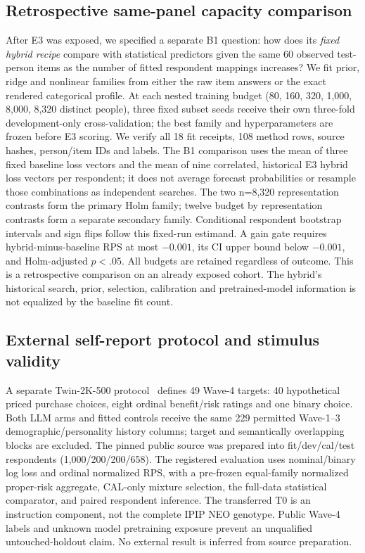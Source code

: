 \documentclass[10pt,twocolumn]{article}
\begin{document}
\subsection{Retrospective same-panel capacity comparison}
After E3 was exposed, we specified a separate B1 question: how does its
\emph{fixed hybrid recipe} compare with statistical predictors given the same
60 observed test-person items as the number of fitted respondent mappings
increases? We fit prior, ridge and nonlinear families from either the raw
item answers or the exact rendered categorical profile. At each nested
training budget (80, 160, 320, 1,000, 8,000, 8,320 distinct people), three
fixed subset seeds receive their own three-fold development-only
cross-validation; the best family and hyperparameters are frozen before E3
scoring. We verify all 18 fit receipts, 108 method rows, source hashes,
person/item IDs and labels. The B1 comparison uses the mean of three fixed
baseline loss vectors and the mean of nine correlated, historical E3 hybrid
loss vectors per respondent; it does not average forecast probabilities or
resample those combinations as independent searches. The two n=8,320
representation contrasts form the primary Holm family; twelve budget by
representation contrasts form a separate secondary family. Conditional
respondent bootstrap intervals and sign flips follow this fixed-run estimand.
A gain gate requires hybrid-minus-baseline RPS at most $-0.001$, its CI upper
bound below $-0.001$, and Holm-adjusted $p<.05$. All budgets are retained
regardless of outcome. This is a retrospective comparison on an already
exposed cohort. The hybrid's historical search, prior, selection, calibration
and pretrained-model information is not equalized by the baseline fit count.

\subsection{External self-report protocol and stimulus validity}
A separate Twin-2K-500 protocol~\cite{toubia2025twin} defines 49 Wave-4 targets:
40 hypothetical priced purchase choices, eight ordinal benefit/risk ratings
and one binary choice. Both LLM arms and fitted controls receive the same
229 permitted Wave-1--3 demographic/personality history columns; target
and semantically overlapping blocks are excluded. The pinned public source
was prepared into fit/dev/cal/test respondents (1,000/200/200/658).
The registered evaluation
uses nominal/binary log loss and ordinal normalized RPS, with a pre-frozen
equal-family normalized proper-risk aggregate, CAL-only mixture selection,
the full-data statistical comparator, and paired respondent inference.
The transferred T0 is an instruction component, not the complete IPIP NEO
genotype. Public Wave-4 labels and unknown model pretraining exposure prevent
an unqualified untouched-holdout claim. No external result is inferred from
source preparation.
\end{document}

